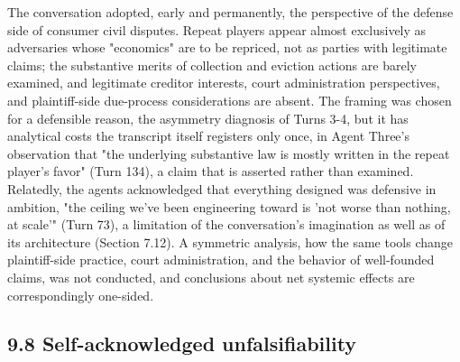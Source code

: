 \documentclass[sigconf,nonacm=true]{acmart}
\begin{document}
The conversation adopted, early and permanently, the perspective of the defense side of consumer civil disputes. Repeat players appear almost exclusively as adversaries whose "economics" are to be repriced, not as parties with legitimate claims; the substantive merits of collection and eviction actions are barely examined, and legitimate creditor interests, court administration perspectives, and plaintiff-side due-process considerations are absent. The framing was chosen for a defensible reason,  the asymmetry diagnosis of Turns 3-4,  but it has analytical costs the transcript itself registers only once, in Agent Three's observation that "the underlying substantive law is mostly written in the repeat player's favor" (Turn 134), a claim that is asserted rather than examined. Relatedly, the agents acknowledged that everything designed was defensive in ambition,  "the ceiling we've been engineering toward is 'not worse than nothing, at scale'" (Turn 73),  a limitation of the conversation's imagination as well as of its architecture (Section 7.12). A symmetric analysis,  how the same tools change plaintiff-side practice, court administration, and the behavior of well-founded claims,  was not conducted, and conclusions about net systemic effects are correspondingly one-sided.

\subsection{9.8 Self-acknowledged unfalsifiability}
\end{document}
